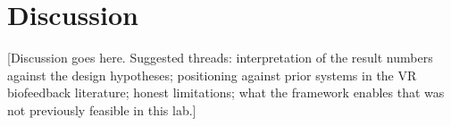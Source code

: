 

\section{Discussion}
\label{sec:discussion}

[Discussion goes here. Suggested threads: interpretation of the
result numbers against the design hypotheses; positioning against
prior systems in the VR biofeedback literature; honest limitations;
what the framework enables that was not previously feasible in this
lab.]
